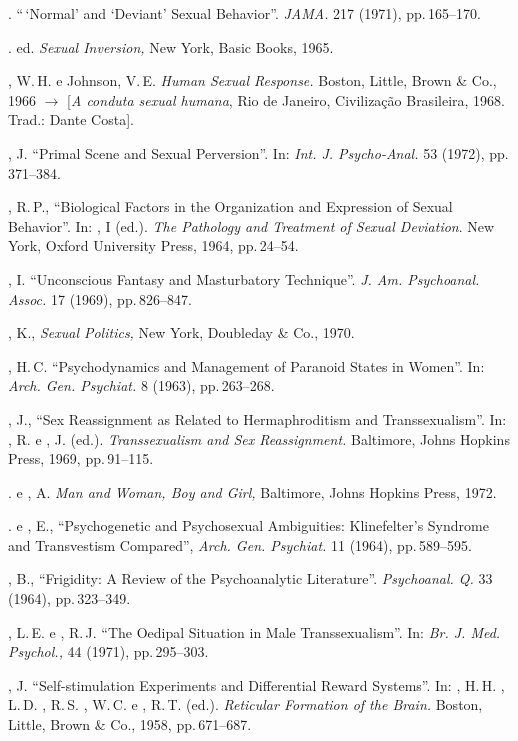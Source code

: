\begin{description}
. ``\,`Normal' and `Deviant' Sexual Behavior''.
\textit{JAMA. }217 (1971), pp.\,165--170.

. ed. \textit{Sexual Inversion, }New York, Basic Books, 1965.

, W.\,H. e Johnson, V.\,E. \textit{Human Sexual Response. }Boston,
Little, Brown \& Co., 1966 {$\bm{\rightarrow}$} [\textit{A conduta sexual humana}, Rio de Janeiro,
Civilização Brasileira, 1968. Trad.: Dante Costa].

, J. ``Primal Scene and Sexual
Perversion''. In: \textit{Int. J. Psycho-Anal. }53 (1972), pp.\,371--384.

, R.\,P., ``Biological Factors in the Organization and
Expression of Sexual Behavior''. In: , I (ed.). \textit{The Pathology and
Treatment of Sexual Deviation}. New York, Oxford University Press, 1964, pp.\,24--54.

, I. ``Unconscious Fantasy and Masturbatory
Technique''. \textit{J. Am. Psychoanal. Assoc. } 17 (1969), pp.\,826--847.

, K., \textit{ Sexual Politics, }New York, Doubleday \& Co., 1970.

, H.\,C. ``Psychodynamics and Management of Paranoid States
in Women''. In: \textit{ Arch. Gen. Psychiat. }8 (1963), pp.\,263--268.

, J., ``Sex Reassignment as Related to Hermaphroditism and
Transsexualism''. In: , R. e , J. (ed.). \textit{Transsexualism and 
Sex Reassignment.} Baltimore, Johns Hopkins Press, 1969, pp.\,91--115.

. e , A. \textit{Man and Woman, Boy and Girl,}
Baltimore, Johns Hopkins Press, 1972.

. e , E., ``Psychogenetic and Psychosexual
Ambiguities: Klinefelter's Syndrome and Transvestism
Compared'', \textit{Arch. Gen. Psychiat.} 11 (1964), pp.\,589--595.

, B., ``Frigidity: A Review of the Psychoanalytic
Literature''. \textit{Psychoanal. Q. }33 (1964), pp.\,323--349.

, L.\,E. e , R.\,J. ``The Oedipal Situation in Male
Transsexualism''. In: \textit{Br. J. Med. Psychol., }44 (1971), pp.\,295--303.

, J. ``Self-stimulation Experiments and Differential Reward
Systems''. In: , H.\,H. , L.\,D. , 
R.\,S. , W.\,C. e , R.\,T. (ed.). \textit{Reticular Formation 
of the Brain.} Boston, Little, Brown \& Co., 1958, pp.\,671--687.


\end{description}
